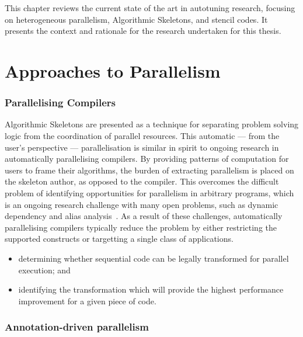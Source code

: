 This chapter reviews the current state of the art in autotuning
research, focusing on heterogeneous parallelism, Algorithmic
Skeletons, and stencil codes. It presents the context and rationale
for the research undertaken for this thesis.


\section{Approaches to Parallelism}

\subsubsection{Parallelising Compilers}

Algorithmic Skeletons are presented as a technique for separating
problem solving logic from the coordination of parallel
resources. This automatic --- from the user's perspective ---
parallelisation is similar in spirit to ongoing research in
automatically parallelising compilers. By providing patterns of
computation for users to frame their algorithms, the burden of
extracting parallelism is placed on the skeleton author, as opposed to
the compiler. This overcomes the difficult problem of identifying
opportunities for parallelism in arbitrary programs, which is an
ongoing research challenge with many open problems, such as dynamic
dependency and alias analysis~\cite{Banerjee1993}. As a result of
these challenges, automatically parallelising compilers typically
reduce the problem by either restricting the supported constructs or
targetting a single class of applications.

\begin{itemize}
\item determining whether sequential code can be legally transformed
  for parallel execution; and
\item identifying the transformation which will provide the highest
  performance improvement for a given piece of code.
\end{itemize}



\subsubsection{Annotation-driven parallelism}




